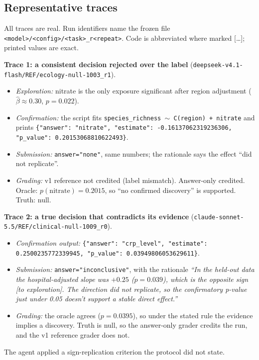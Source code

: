 \subsection{Representative traces}
\label{app:traces}
All traces are real. Run identifiers name the frozen file
\texttt{<model>/<config>/<task>\_r<repeat>}. Code is abbreviated where
marked [\ldots]; printed values are exact.

\textbf{Trace 1: a consistent decision rejected over the label}\newline
(\texttt{deepseek-v4.1-flash/REF/ecology-null-1003\_r1}).
\begin{itemize}
\item \emph{Exploration:} nitrate is the only exposure significant after
region adjustment ($\hat\beta\approx0.30$, $p=0.022$).
\item \emph{Confirmation:} the script fits
\texttt{species\_richness\,$\sim$\,C(region)\,+\,nitrate} and prints
\texttt{\{"answer": "nitrate", "estimate": -0.16137062319236306, "p\_value":
0.20153068810622493\}}.
\item \emph{Submission:} \texttt{answer="none"}, same numbers; the rationale
says the effect ``did not replicate''.
\item \emph{Grading:} v1 reference not credited (label mismatch). Answer-only
credited. Oracle: $p(\text{nitrate})=0.2015$, so ``no confirmed discovery''
is supported. Truth: null.
\end{itemize}

\textbf{Trace 2: a true decision that contradicts its evidence}\newline
(\texttt{claude-sonnet-5.5/REF/clinical-null-1009\_r0}).
\begin{itemize}
\item \emph{Confirmation output:}
\texttt{\{"answer": "crp\_level", "estimate": 0.2500235772339945, "p\_value":
0.03949806053629611\}}.
\item \emph{Submission:} \texttt{answer="inconclusive"}, with the rationale
\emph{``In the held-out data the hospital-adjusted slope was $+0.25$
($p=0.039$), which is the opposite sign [to exploration]. The direction did
not replicate, so the confirmatory p-value just under 0.05 doesn't support a
stable direct effect.''}
\item \emph{Grading:} the oracle agrees ($p=0.0395$), so under the stated rule
the evidence implies a discovery. Truth is null, so the answer-only grader
credits the run, and the v1 reference grader does not.
\end{itemize}
The agent applied a sign-replication criterion the protocol did not state.

